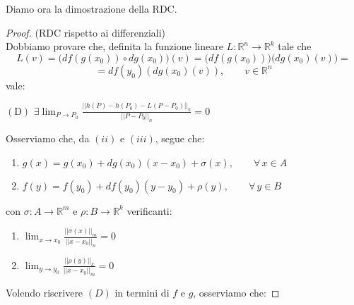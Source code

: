 Diamo ora la dimostrazione della RDC.

\begin{proof}
(RDC rispetto ai differenziali)\\
Dobbiamo provare che, definita la funzione lineare $L : \mathbb{R}^n \longrightarrow \mathbb{R}^k$ tale che
$$
L(v) = \Big( df(g(x_0)) \circ dg(x_0) \Big) (v) = \Big( df(g(x_0)) \Big) \big( dg(x_0)(v) \big) = $$
$$
= df(y_0)(dg(x_0)(v)), \qquad v \in \mathbb{R}^n
$$
vale:
\begin{center}
$\mathrm{(D)}$
\hfill
$\displaystyle \exists \lim_{P \rightarrow P_0} \frac{||h(P)-h(P_0)-L(P-P_0)||_k}{||P-P_0||_n} = 0 $
\hfill \null \\
\end{center}
Osserviamo che, da $(ii)$ e $(iii)$, segue che:
\begin{enumerate}[labelindent=\parindent,leftmargin=*,label=\textnormal{(\arabic*)},start=1]
\item $g(x) = g(x_0) + dg(x_0)(x-x_0) + \sigma(x), \qquad \forall \, x \in A$
\item $f(y) = f(y_0) + df(y_0)(y-y_0) + \rho(y), \qquad \forall \, y \in B$
\end{enumerate}
con $\sigma : A \longrightarrow \mathbb{R}^m$ e $\rho : B \longrightarrow \mathbb{R}^k$ verificanti:
\begin{enumerate}[labelindent=\parindent,leftmargin=*,label=\textnormal{(\arabic*)},start=3]
\item $\displaystyle \lim_{x \rightarrow x_0} \frac{||\sigma(x)||_m}{||x-x_0||_n} = 0$
\item $\displaystyle \lim_{y \rightarrow y_0} \frac{||\rho(y)||_k}{||x-x_0||_m} = 0$
\end{enumerate}
Volendo riscrivere $(D)$ in termini di $f$ e $g$, osserviamo che:
\end{proof}
